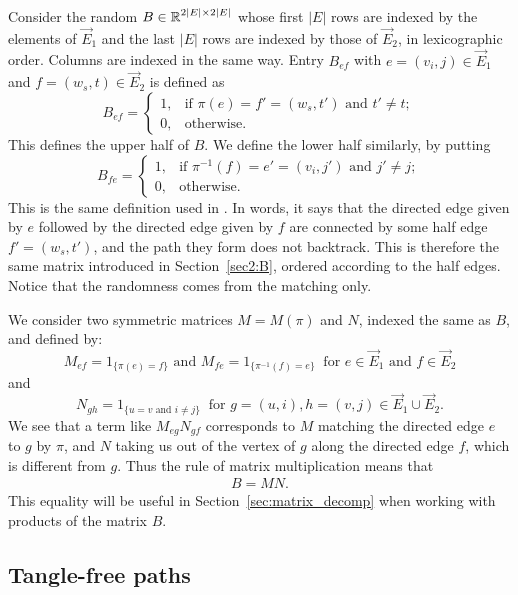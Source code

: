 Consider the random 
$B \in \operatorname{\mathbb{R}}^{2 |E|\times 2 |E|}$ 
whose first $|E|$ rows are indexed by the elements of $\vec{E}_1$ 
and the last $|E|$ rows are indexed by those of $\vec{E}_2$, 
in lexicographic order. 
Columns are indexed in the same way. 
Entry $B_{ef}$ with 
$e=(v_i,j) \in \vec{E}_1$ and $f=(w_s,t) \in \vec{E}_2$ 
is defined as
\[
B_{ef}=
\begin{cases}
  1,& \mbox{if $\pi(e) = f' = (w_s, t')$ and $t'\neq t$};\\
  0,& \textrm{otherwise}.
\end{cases}
\]
This defines the upper half of $B$. We define the lower half similarly, by putting
\[
B_{fe}=
\begin{cases}
  1,&\textrm{if $\pi^{-1}(f) = e' = (v_i, j')$ and $j'\neq j$};\\
  0,& \textrm{otherwise}.
\end{cases}
\]
This is the same definition used in \cite{bordenave2015}. 
In words, it says that the directed edge given by $e$ 
followed by the directed edge given by $f$ 
are connected by some half edge $f' = (w_s, t')$,
and the path they form does not backtrack.
This is therefore the same matrix introduced in Section~\ref{sec2:B},
ordered according to the half edges.
Notice that the randomness comes from the matching only. 

We consider two symmetric matrices $M = M(\pi)$ and $N$, 
indexed the same as $B$, and defined by:
\[
M_{ef} = 1_{ \{ \pi(e) = f \} } 
\mbox{ and }
M_{fe} = 1_{ \{ \pi^{-1} (f) = e \} }
~\mbox{ for $e\in \vec{E}_1$ and $f\in \vec{E}_2$}
\]
and
\[
N_{gh} = 1_{ \{u = v \mbox{ and } i\neq j \}}
~\mbox{ for $g = (u,i), h = (v,j) \in \vec{E}_1 \cup \vec{E}_2$} .
\]
We see that a term like $M_{eg} N_{gf}$ corresponds to
$M$ matching the directed edge $e$ to $g$ by $\pi$, 
and $N$ taking us out of the vertex of $g$ along the directed edge $f$, 
which is different from $g$.
Thus the rule of matrix multiplication means that
\begin{align}\label{eq:B=MN}
B=MN.
\end{align}
This equality will be useful in Section~\ref{sec:matrix_decomp}
when working with products of the matrix $B$.

\subsection{Tangle-free paths}
\label{sec:tangle_free}

